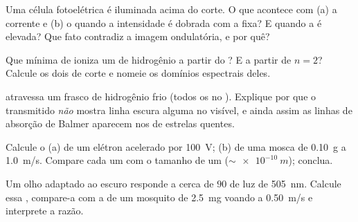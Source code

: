 \begin{exercise}[$\star\star$]\label{exo:g12:quantum-world:7}
Uma célula fotoelétrica é iluminada acima do corte. O que acontece com (a) a corrente e
(b) o  quando a intensidade é dobrada com a  fixa? E quando
a  é elevada? Que fato contradiz a imagem ondulatória, e por quê?
\end{exercise}

\begin{exercise}[$\star\star$]\label{exo:g12:quantum-world:8}
Que  mínima de  ioniza um  de hidrogênio a partir do ? E a partir de $n = 2$? Calcule os dois  de corte e
nomeie os domínios espectrais deles.
\end{exercise}

\begin{exercise}[$\star\star$]\label{exo:g12:quantum-world:9}
 atravessa um frasco de hidrogênio frio (todos os  no ). Explique por que o  transmitido \emph{não} mostra linha escura
alguma no visível, e ainda assim as linhas de absorção de Balmer aparecem nos 
de estrelas quentes.
\end{exercise}

\begin{exercise}[$\star\star$]\label{exo:g12:quantum-world:10}
Calcule o  (a) de um elétron acelerado por
\qty{100}{V}; (b) de uma mosca de \qty{0.10}{g} a \qty{1.0}{m/s}. Compare cada um com o
tamanho de um  ($\sim \qty{e-10}{m}$); conclua.
\end{exercise}

\begin{exercise}[$\star\star$]\label{exo:g12:quantum-world:11}
Um olho adaptado ao escuro responde a cerca de $90$  de luz de \qty{505}{nm}.
Calcule essa , compare-a com a  de um mosquito de \qty{2.5}{mg}
voando a \qty{0.50}{m/s} e interprete a razão.
\end{exercise}

